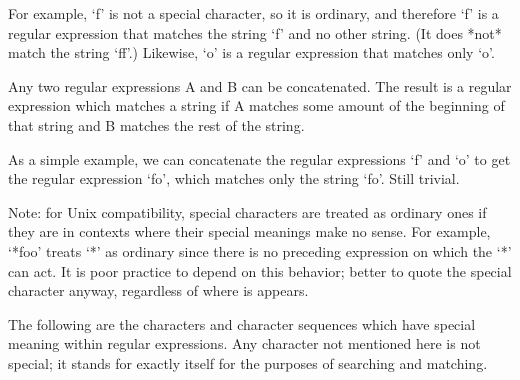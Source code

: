 For example, `f' is not a special character, so it is ordinary, and
therefore `f' is a regular expression that matches the string `f' and
no other string. (It does *not* match the string `ff'.) Likewise,
`o' is a regular expression that matches only `o'.

Any two regular expressions A and B can be concatenated. The result
is a regular expression which matches a string if A matches some
amount of the beginning of that string and B matches the rest of the
string.

As a simple example, we can concatenate the regular expressions `f'
and `o' to get the regular expression `fo', which matches only the
string `fo'. Still trivial.

Note: for Unix compatibility, special characters are treated as
ordinary ones if they are in contexts where their special meanings
make no sense. For example, `*foo' treats `*' as ordinary since
there is no preceding expression on which the `*' can act. It is
poor practice to depend on this behavior; better to quote the special
character anyway, regardless of where is appears.


The following are the characters and character sequences which have
special meaning within regular expressions. Any character not
mentioned here is not special; it stands for exactly itself for the
purposes of searching and matching.

